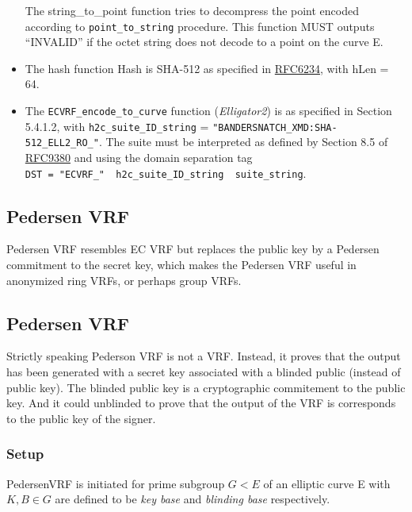 \documentclass[
]{article}
\begin{document}
\begin{itemize}
  The string\_to\_point function tries to decompress the point encoded
  according to \texttt{point\_to\_string} procedure. This function MUST
  outputs ``INVALID'' if the octet string does not decode to a point on
  the curve E.
\item
  The hash function Hash is SHA-512 as specified in
  \href{https://www.rfc-editor.org/rfc/rfc6234}{RFC6234}, with hLen =
  64.
\item
  The \texttt{ECVRF\_encode\_to\_curve} function (\emph{Elligator2}) is
  as specified in Section 5.4.1.2, with \texttt{h2c\_suite\_ID\_string}
  = \texttt{"BANDERSNATCH\_XMD:SHA-512\_ELL2\_RO\_"}. The suite must be
  interpreted as defined by Section 8.5 of
  \href{https://datatracker.ietf.org/doc/rfc9380/}{RFC9380} and using
  the domain separation tag
  \texttt{DST\ =\ "ECVRF\_"\ \textbar{}\textbar{}\ h2c\_suite\_ID\_string\ \textbar{}\textbar{}\ suite\_string}.
\end{itemize}

\hypertarget{pedersen-vrf}{%
\subsection{Pedersen VRF}\label{pedersen-vrf}}

Pedersen VRF resembles EC VRF but replaces the public key by a Pedersen
commitment to the secret key, which makes the Pedersen VRF useful in
anonymized ring VRFs, or perhaps group VRFs.

\hypertarget{pedersen-vrf-1}{%
\subsection{Pedersen VRF}\label{pedersen-vrf-1}}

Strictly speaking Pederson VRF is not a VRF. Instead, it proves that the
output has been generated with a secret key associated with a blinded
public (instead of public key). The blinded public key is a
cryptographic commitement to the public key. And it could unblinded to
prove that the output of the VRF is corresponds to the public key of the
signer.

\hypertarget{setup}{%
\subsubsection{Setup}\label{setup}}

PedersenVRF is initiated for prime subgroup \(G < E\) of an elliptic
curve E with \(K, B \in G\) are defined to be \emph{key base} and
\emph{blinding base} respectively.
\end{document}
